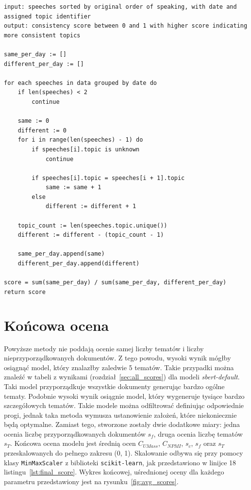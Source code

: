 	\begin{lstlisting}[style=algorithm,label=lst:consistency_alg,caption=Algorytm obliczania spójności tematów]
input: speeches sorted by original order of speaking, with date and assigned topic identifier
output: consistency score between 0 and 1 with higher score indicating more consistent topics
	
same_per_day := []
different_per_day := []

for each speeches in data grouped by date do
	if len(speeches) < 2
		continue
	
	same := 0
	different := 0
	for i in range(len(speeches) - 1) do
		if speeches[i].topic is unknown
			continue

		if speeches[i].topic = speeches[i + 1].topic
			same := same + 1
		else
			different := different + 1

	topic_count := len(speeches.topic.unique())
	different := different - (topic_count - 1)
	
	same_per_day.append(same)
	different_per_day.append(different)

score = sum(same_per_day) / sum(same_per_day, different_per_day)
return score
	\end{lstlisting}

\section{Końcowa ocena}
	Powyższe metody nie poddają ocenie samej liczby tematów i liczby nieprzyporządkowanych dokumentów.
	Z tego powodu, wysoki wynik mógłby osiągnąć model, który znalazłby zaledwie 5 tematów.
	Takie przypadki można znaleźć w tabeli z wynikami (rozdział~\ref{sec:all_scores}) dla modeli \emph{sbert-default}.
	Taki model przyporządkuje wszystkie dokumenty generując bardzo ogólne tematy.
	Podobnie wysoki wynik osiągnie model, który wygeneruje tysiące bardzo szczegółowych tematów.
	Takie modele można odfiltrować definiując odpowiednie progi, jednak taka metoda wymusza ustanowienie założeń,
		które niekoniecznie będą optymalne.
	Zamiast tego, stworzone zostały dwie dodatkowe miary: jedna ocenia liczbę przyporządkowanych dokumentów \(s_f\), druga ocenia liczbę tematów \(s_T\).
	Końcowa ocena modelu jest średnią ocen \(C_{UMass}\), \(C_{NPMI}\), \(s_c\), \(s_f\) oraz \(s_T\) przeskalowanych do pełnego zakresu (0, 1).
	Skalowanie odbywa się przy pomocy klasy \verb|MinMaxScaler| z biblioteki \verb|scikit-learn|,
		jak przedstawiono w linijce 18 listingu~\ref{lst:final_score}.
	Wykres końcowej, uśrednionej oceny dla każdego parametru przedstawiony jest na rysunku~\ref{fig:avg_scores}.


